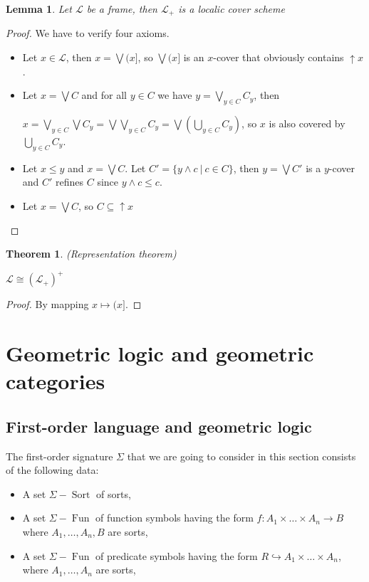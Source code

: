 \documentclass[a4paper]{article}
\theoremstyle{defin}
\theoremstyle{theorem}
\newtheorem{theorem}{Theorem}
\theoremstyle{claim}
\theoremstyle{prop}
\theoremstyle{lemma}
\newtheorem{lemma}{Lemma}
\theoremstyle{fact}
\theoremstyle{ex}
\theoremstyle{col}
\begin{document}
\begin{lemma} Let $\mathcal{L}$ be a frame, then $\mathcal{L}_+$ is a localic cover scheme
\end{lemma}
\begin{proof}
We have to verify four axioms.

\begin{itemize}
\item Let $x \in \mathcal{L}$, then $x = \bigvee (x]$, so $\bigvee (x]$ is an $x$-cover that obviously contains $\uparrow x$.
\item Let $x = \bigvee C$ and for all $y \in C$ we have $y = \bigvee \limits_{y \in C} C_y$, then
\begin{center}
$x = \bigvee \limits_{y \in C} \bigvee C_y = \bigvee \bigvee \limits_{y \in C} C_y = \bigvee (\bigcup \limits_{y \in C} C_y)$, so $x$ is also covered by $\bigcup \limits_{y \in C} C_y$.
\end{center}
\item Let $x \leq y$ and $x = \bigvee C$. Let $C' = \{ y \wedge c \: | \: c \in C \}$, then $y = \bigvee C'$ is a $y$-cover and $C'$ refines $C$ since $y \wedge c \leq c$.
\item Let $x = \bigvee C$, so $C \subseteq \uparrow x$
\end{itemize}
\end{proof}

\begin{theorem} (Representation theorem)

$\mathcal{L} \cong (\mathcal{L}_+)^{+}$
\end{theorem}

\begin{proof}
By mapping $x \mapsto (x]$.
\end{proof}

\section{Geometric logic and geometric categories}

\subsection{First-order language and geometric logic}

The first-order signature $\Sigma$ that we are going to consider in this section consists of the following data:
\begin{itemize}
\item A set $\Sigma-\operatorname{Sort}$ of sorts,
\item A set $\Sigma-\operatorname{Fun}$ of function symbols having the form $f : A_1 \times \dots \times A_n \to B$ where $A_1, \dots, A_n, B$ are sorts,
\item A set $\Sigma-\operatorname{Fun}$ of predicate symbols having the form $R \hookrightarrow A_1 \times \dots \times A_n$, where $A_1, \dots, A_n$ are sorts,
\end{itemize}
\end{document}
